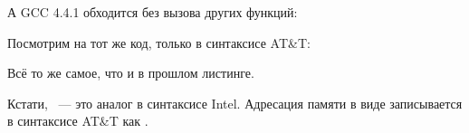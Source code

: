 А GCC 4.4.1 обходится без вызова других функций:




Посмотрим на тот же код, только в синтаксисе AT\&T:



\myindex{\ATTSyntax}
Всё то же самое, что и в прошлом листинге.

Кстати, ~--- это аналог  в синтаксисе Intel.
Адресация памяти в виде  записывается в синтаксисе AT\&T как .

